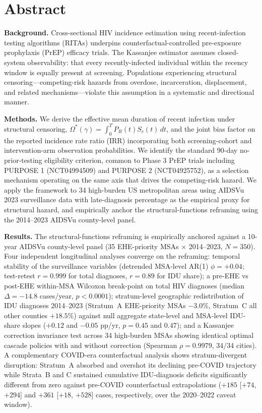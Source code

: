 \documentclass[12pt]{article}
\begin{document}
\newpage

\section*{Abstract}

\noindent\textbf{Background.} Cross-sectional HIV incidence estimation using recent-infection testing algorithms (RITAs) underpins counterfactual-controlled pre-exposure prophylaxis (PrEP) efficacy trials. The Kassanjee estimator assumes closed-system observability: that every recently-infected individual within the recency window is equally present at screening. Populations experiencing structural censoring---competing-risk hazards from overdose, incarceration, displacement, and related mechanisms---violate this assumption in a systematic and directional manner.

\medskip
\noindent\textbf{Methods.} We derive the effective mean duration of recent infection under structural censoring, $\Omega^*(\gamma) = \int_0^T P_R(t) S_c(t)\, dt$, and the joint bias factor on the reported incidence rate ratio (IRR) incorporating both screening-cohort and intervention-arm observation probabilities. We identify the standard 90-day no-prior-testing eligibility criterion, common to Phase 3 PrEP trials including PURPOSE 1 (NCT04994509) and PURPOSE 2 (NCT04925752), as a selection mechanism operating on the same axis that drives the competing-risk hazard. We apply the framework to 34 high-burden US metropolitan areas using AIDSVu 2023 surveillance data with late-diagnosis percentage as the empirical proxy for structural hazard, and empirically anchor the structural-functions reframing using the 2014--2023 AIDSVu county-level panel.

\medskip
\noindent\textbf{Results.} The structural-functions reframing is empirically anchored against a 10-year AIDSVu county-level panel (35 EHE-priority MSAs $\times$ 2014--2023, $N = 350$). Four independent longitudinal analyses converge on the reframing: temporal stability of the surveillance variables (detrended MSA-level AR(1) $\phi = +0.04$; test-retest $r = 0.999$ for total diagnoses, $r = 0.89$ for IDU share); a pre-EHE vs post-EHE within-MSA Wilcoxon break-point on total HIV diagnoses (median $\Delta = -14.8$ cases/year, $p < 0.0001$); stratum-level geographic redistribution of IDU diagnoses 2014--2023 (Stratum~A EHE-priority MSAs $-3.0\%$, Stratum~C all other counties $+18.5\%$) against null aggregate state-level and MSA-level IDU-share slopes ($+0.12$ and $-0.05$ pp/yr, $p = 0.45$ and $0.47$); and a Kassanjee correction invariance test across 34 high-burden MSAs showing identical optimal cascade policies with and without correction (Spearman $\rho = 0.9979$, 34/34 cities). A complementary COVID-era counterfactual analysis shows stratum-divergent disruption: Stratum~A absorbed and overshot its declining pre-COVID trajectory while Strata~B and C sustained cumulative IDU-diagnosis deficits significantly different from zero against pre-COVID counterfactual extrapolations ($+185$ [$+74$, $+294$] and $+361$ [$+18$, $+528$] cases, respectively, over the 2020--2022 caveat window).
\end{document}
